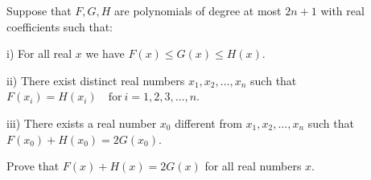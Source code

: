 Suppose that $F,G,H$ are polynomials of degree at most $2n+1$ with real coefficients such that:

i) For all real $x$ we have $F(x)\le G(x)\le H(x)$.

ii) There exist distinct real numbers $x_1,x_2,\ldots ,x_n$ such that $F(x_i)=H(x_i)\quad\text{for}\ i=1,2,3,\ldots ,n$.

iii) There exists a real number $x_0$ different from $x_1,x_2,\ldots ,x_n$ such that $F(x_0)+H(x_0)=2G(x_0)$.

Prove that $F(x)+H(x)=2G(x)$ for all real numbers $x$.